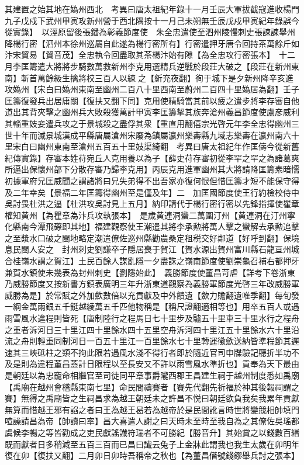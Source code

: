 其建置之始其地在媯州西北　考異曰唐太祖紀年錄十一月壬辰大軍拔截寇進收楊門九子戊戍下武州甲寅攻新州營于西北隅按十一月己未朔無壬辰戊戍甲寅紀年錄誤今從實錄】　以涇原留後張鐇為彰義節度使　朱全忠遣使至泗州陵慢刺史張諫諫舉州降楊行密【泗州本徐州巡屬自此遂為楊行密所有】行密遣押牙唐令回持茶萬餘斤如汴宋貿易【貿音茂】全忠執令回盡取其茶楊汴始有隙【為全忠攻行密張本】　十二月李匡籌遣大將將步騎數萬救新州李克用選精兵逆戰於段莊大破之【段莊在新州東南】斬首萬餘級生擒將校三百人以練之【紤充夜翻】徇于城下是夕新州降辛亥進攻媯州【宋白曰媯州東南至幽州二百八十里西南至蔚州二百四十里媯居為翻】壬子匡籌復發兵出居庸關【復扶又翻下同】克用使精騎當其前以疲之遣步將李存審自他道出其背夾擊之幽州兵大敗殺獲萬計甲寅李匡籌挈其族奔滄州義昌節度使盧彦威利其輜重妓妾遣兵攻之于景城殺之盡俘其衆【重直用翻僖宗光啓元年李全忠得幽州三世十年而滅景城漢成平縣唐屬滄州宋廢為鎮屬瀛州樂夀縣九域志樂夀在瀛州南六十里宋白曰幽州東南至滄州五百五十里妓渠綺翻　考異曰唐太祖紀年作匡儔今從新舊紀傳實錄】存審本姓苻宛丘人克用養以為子【薛史苻存審初從李罕之罕之為諸葛爽所逼出保懷州部下分散存審乃歸李克用】丙辰克用進軍幽州其大將請降匡籌素暗懦初據軍府兄匡威聞之謂諸將曰兄失弟得不出吾家亦復何恨但惜匡籌才短不能保守得及二年幸矣【景福二年匡籌得幽州至是僅及年】二　加匡國節度使王行約檢校侍中　吳討畏杜洪之逼【杜洪攻吳討見上五月】納印請代于楊行密行密以先鋒指揮使瞿章權知黄州【為瞿章為汴兵攻執張本】　是歲黄連洞蠻二萬圍汀州【黄連洞在汀州寧化縣南今潭飛磜即其地】福建觀察使王潮遣其將李承勲將萬人擊之蠻解去承勲追擊之至漿水口破之閩地略定潮遣僚佐巡州縣勸農桑定租税交好鄰道【好呼到翻】保境息民閩人安之　封州刺史劉謙卒子隱居喪于賀江【賀水源出賀州富川縣石龍亘州城合桂嶺水謂之賀江】土民百餘人謀亂隱一夕盡誅之嶺南節度使劉崇龜召補右都押牙兼賀水鎮使未幾表為封州刺史【劉隱始此】　義勝節度使董昌苛虐【詳考下卷浙東乃威勝節度又按新書方鎮表廣明三年升浙東道觀察為義勝軍節度光啓三年改威勝軍威勝為是】於常賦之外加歛數倍以充貢獻及中外饋遺【歛力贍翻遺唯季翻】每旬發一綱金萬兩銀五千鋌越綾萬五千匹他物稱是【稱尺證翻適相等也】用卒五百人或遇雨雪風水違程則皆死【唐制陸行之程馬日七十里步及驢五十里車三十里水行之程舟之重者泝河日三十里江四十里餘水四十五里空舟泝河四十里江五十里餘水六十里沿流之舟則輕重同制河日一百五十里江一百里餘水七十里轉運徵歛送納皆準程節其遲速其三峽砥柱之類不拘此限若遇風水淺不得行者即於隨近官司申牒驗記聽折半功不及是則為違程董昌蓋計日限程以至長安又不許以雨雪風水準折也】貢奉為天下最由是朝廷以為忠寵命相繼官至司徒同平章事爵隴西郡王昌建生祠于越州制度悉如禹廟【禹廟在越州會稽縣東南七里】命民間禱賽者【賽先代翻先祈福於神其後報祠謂之賽】無得之禹廟皆之生祠昌求為越王朝廷未之許昌不悦曰朝廷欲負我矣我累年貢獻無算而惜越王邪有諂之者曰王為越王曷若為越帝於是民間訛言時世將變競相帥填門喧譟請昌為帝【帥讀曰率】昌大喜遣人謝之曰天時未至時至我自為之其僚佐吳瑤都虞候李暢之等皆勸成之吏民獻謠䜟符瑞者不可勝紀【勝音升】其始賞之以錢數百緡既而獻者日多稍減至五百三百而已昌曰䜟云兔子上金牀此謂我也我生太歲在卯明年復在卯【復扶又翻】二月卯日卯時吾稱帝之秋也【為董昌僭號錢鏐舉兵討之張本】

